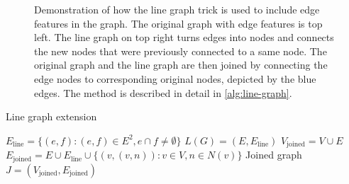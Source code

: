 \documentclass[english, 12pt, a4paper, sci, utf8, a-2b, online]{aaltothesis}
\begin{document}
\begin{figure}[t]
    \centering
    
    \caption{Demonstration of how the line graph trick is used to include edge features in the graph. The original graph with edge features is top left. The line graph on top right turns edges into nodes and connects the new nodes that were previously connected to a same node. The original graph and the line graph are then joined by connecting the edge nodes to corresponding original nodes, depicted by the  blue edges. The method is described in detail in \cref{alg:line-graph}.}
    \label{fig:line-graph}
\end{figure}


\begin{algorithm}

    \caption{Line graph extension}
    \label{alg:line-graph}
    \begin{algorithmic}
        \State $E_{\text{line}} = \{(e, f) : (e, f) \in E^2, e\cap f \neq \emptyset\}$
        \State $L(G) = (E, E_{\text{line}})$ 
        \State $V_\text{joined} = V \cup E$
        \State $E_\text{joined} = E \cup E_\text{line} \cup \{(v, (v, n)) : v \in V, n \in N(v)\}$
        \State Joined graph $J = (V_\text{joined}, E_\text{joined})$
    \end{algorithmic}
    
\end{algorithm}



\end{document}
